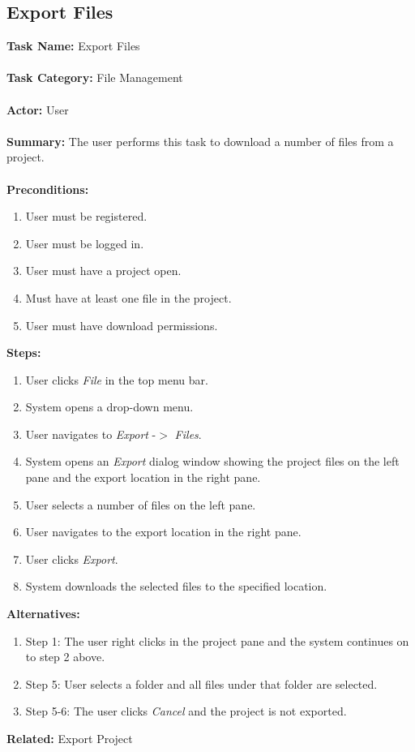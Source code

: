 \documentclass[14pt, a4paper]{article}
\begin{document}
\newpage

\subsection{Export Files}

\begin{framed}
	\noindent\textbf{Task Name:} Export Files \\ \\
	\textbf{Task Category:} File Management \\ \\
	\textbf{Actor:} User \\ \\
	\textbf{Summary:} The user performs this task to download a number of files from a project. \\ \\
	\textbf{Preconditions:} 
	\begin{enumerate}
		\item User must be registered.
		\item User must be logged in.
		\item User must have a project open.
		\item Must have at least one file in the project.
		\item User must have download permissions.
	\end{enumerate}
	\textbf{Steps:}
	\begin{enumerate}
		\item User clicks \textit{File} in the top menu bar.
		\item System opens a drop-down menu.
		\item User navigates to \textit{Export} -$>$ \textit{Files}.
		\item System opens an \textit{Export} dialog window showing the project files on the left pane and the export location in the right pane.
		\item User selects a number of files on the left pane.
		\item User navigates to the export location in the right pane.
		\item User clicks \textit{Export}.
		\item System downloads the selected files to the specified location.
	\end{enumerate}
	\textbf{Alternatives:} 
	\begin{enumerate}
		\item Step 1: The user right clicks in the project pane and the system continues on to step 2 above.
		\item Step 5: User selects a folder and all files under that folder are selected.
		\item Step 5-6: The user clicks \textit{Cancel} and the project is not exported.
	\end{enumerate}
	\textbf{Related:} Export Project
\end{framed}
\end{document}
